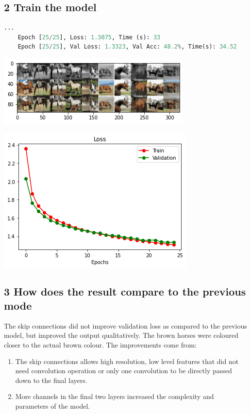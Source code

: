 \documentclass{article}
\begin{document}
\subsection*{2 Train the model}


\begin{lstlisting}[language=Python]
	...
	Epoch [25/25], Loss: 1.3075, Time (s): 33
	Epoch [25/25], Val Loss: 1.3323, Val Acc: 48.2%, Time(s): 34.52
\end{lstlisting}

\includegraphics{C2.1.png}

\includegraphics{C2.2.png}

\subsection*{3 How  does  the  result  compare  to  the  previous  mode}

The skip connections did not improve validation loss as compared to the previous model, but improved the output qualitatively. The brown horses were coloured closer to the actual brown colour. The improvements come from:

\begin{enumerate}
\item The skip connections allows high resolution, low level features that did not need convolution operation or only one convolution to be directly passed down to the final layers. 
\item More channels in the final two layers increased the complexity and parameters of the model.
\end{enumerate}
\end{document}
